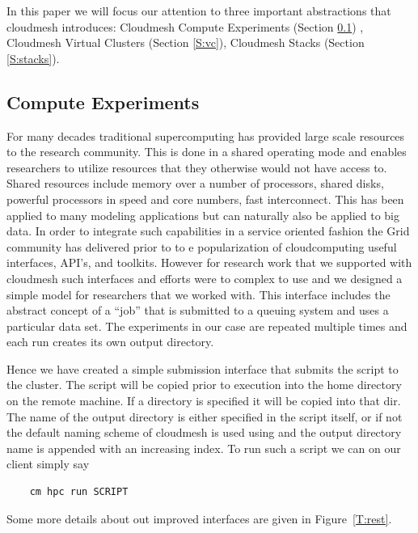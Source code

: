 In this paper we will focus our attention to three important
abstractions that cloudmesh introduces: Cloudmesh Compute Experiments
(Section \ref{S:experiments}) , Cloudmesh Virtual Clusters (Section
\ref{S:vc}), Cloudmesh Stacks (Section \ref{S:stacks}).

\subsection{Compute Experiments} \label{S:experiments}

For many decades traditional supercomputing has provided large scale
resources to the research community. This is done in a shared
operating mode and enables researchers to utilize resources that they
otherwise would not have access to. Shared resources include
memory over a number of processors, shared disks, powerful processors
in speed and core numbers, fast interconnect. This has been applied to
many modeling applications but can naturally also be applied to big
data. In order to integrate such capabilities in a service oriented
fashion the Grid community has delivered prior to to e popularization
of cloudcomputing useful interfaces, API's, and toolkits. However for
research work that we supported with cloudmesh such interfaces and
efforts were to complex to use and we designed a simple model for
researchers that we worked with. This interface includes the abstract
concept of a ``job'' that is submitted to a queuing system and uses a
particular data set. The experiments in our case are repeated multiple
times and each run creates its own output directory.

Hence we have created a simple submission interface that submits the
script to the cluster. The script will be copied prior to execution
into the home directory on the remote machine. If a directory is
specified it will be copied into that dir.  The name of the output
directory is either specified in the script itself, or if not the
default naming scheme of cloudmesh is used using and the output
directory name is appended with an increasing index. To run such a
script we can on our client simply say
 
\begin{verbatim}
    cm hpc run SCRIPT
\end{verbatim}

Some more details about out improved interfaces are given in
Figure~\ref{T:rest}.

